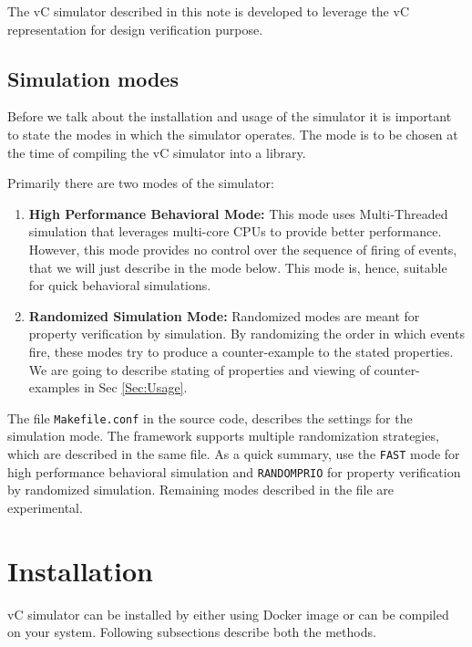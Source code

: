 \documentclass[12pt,a4paper]{article}
\begin{document}
The vC simulator described in this note is developed to leverage the vC representation for design verification purpose.


\subsection{Simulation modes}

Before we talk about the installation and usage of the simulator it is important to state the modes in which the simulator operates. The mode is to be chosen at the time of compiling the vC simulator into a library.

Primarily there are two modes of the simulator:

\begin{enumerate}
\item \textbf{High Performance Behavioral Mode:} This mode uses Multi-Threaded simulation that leverages multi-core CPUs to provide better performance. However, this mode provides no control over the sequence of firing of events, that we will just describe in the mode below. This mode is, hence, suitable for quick behavioral simulations.

\item \textbf{Randomized Simulation Mode:} Randomized modes are meant for property verification by simulation. By randomizing the order in which events fire, these modes try to produce a counter-example to the stated properties. We are going to describe stating of properties and viewing of counter-examples in Sec \ref{Sec:Usage}.

\end{enumerate}

The file \texttt{Makefile.conf} in the source code, describes the settings for the simulation mode. The framework supports multiple randomization strategies, which are described in the same file. As a quick summary, use the \texttt{FAST} mode for high performance behavioral simulation and \texttt{RANDOMPRIO} for property verification by randomized simulation. Remaining modes described in the file are experimental.

\clearpage
\section{Installation}

vC simulator can be installed by either using Docker image or can be compiled on your system. Following subsections describe both the methods.
\end{document}
